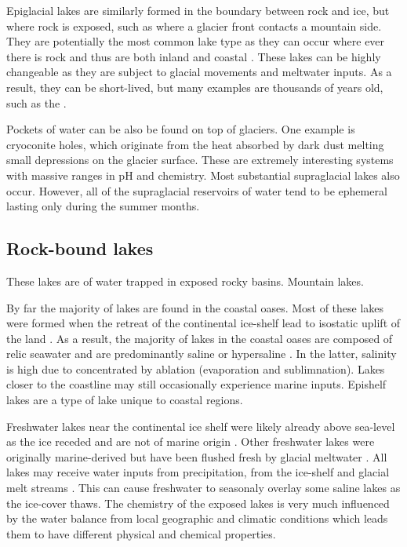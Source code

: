 Epiglacial lakes are similarly formed in the boundary between rock and ice, but where rock is exposed, such as where a glacier front contacts a mountain side.
They are potentially the most common lake type as they can occur where ever there is rock and thus are both inland and coastal \cite{Hodgson2012}. %
These lakes can be highly changeable as they are subject to glacial movements and meltwater inputs.
As a result, they can be short-lived, but many examples are thousands of years old, such as the .

Pockets of water can be also be found on top of glaciers. 
One example is cryoconite holes, which originate from the heat absorbed by dark dust melting small depressions on the glacier surface. 
These are extremely interesting systems with massive ranges in pH and chemistry.
Most substantial supraglacial lakes also occur.
However, all of the supraglacial reservoirs of water tend to be ephemeral lasting only during the summer months.

\subsection{Rock-bound lakes}
These lakes are of water trapped in exposed rocky basins.
Mountain lakes. %

By far the majority of lakes are found in the coastal oases. %
Most of these lakes were formed when the retreat of the continental ice-shelf lead to isostatic uplift of the land \cite{Burton1981}. %
As a result, the majority of lakes in the coastal oases are composed of relic seawater and are predominantly saline or hypersaline \cite{Burke1988}.
In the latter, salinity is high due to concentrated by ablation (evaporation and sublimnation). %
Lakes closer to the coastline may still occasionally experience marine inputs. %
Epishelf lakes are a type of lake unique to coastal regions.

Freshwater lakes near the continental ice shelf were likely already above sea-level as the ice receded and are not of marine origin \cite{Bronge1996}.%
Other freshwater lakes were originally marine-derived but have been flushed fresh by glacial meltwater \cite{Pickard1986}.
All lakes may receive water inputs from precipitation, from the ice-shelf and glacial melt streams \cite{Burton1981}. 
This can cause freshwater to seasonaly overlay some saline lakes as the ice-cover thaws.
The chemistry of the exposed lakes is very much influenced by the water balance from local geographic and climatic conditions which leads them to have different physical and chemical properties.

